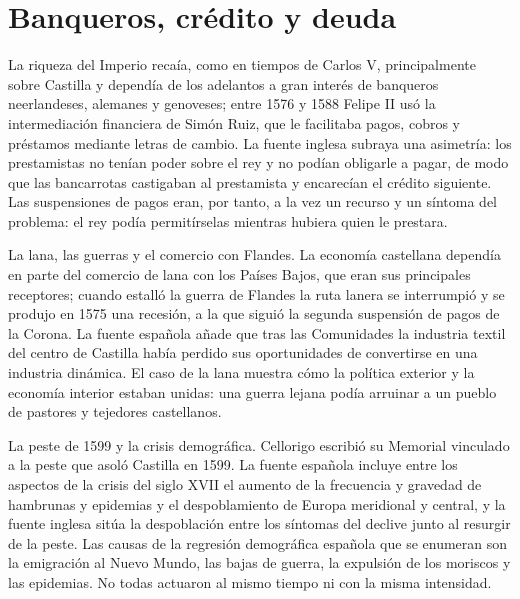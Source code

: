 \documentclass{book}
\begin{document}
\section{Banqueros, crédito y deuda}

La riqueza del Imperio recaía, como en tiempos de Carlos V, principalmente sobre Castilla y dependía de los adelantos a gran interés de banqueros neerlandeses, alemanes y genoveses; entre 1576 y 1588 Felipe II usó la intermediación financiera de Simón Ruiz, que le facilitaba pagos, cobros y préstamos mediante letras de cambio. La fuente inglesa subraya una asimetría: los prestamistas no tenían poder sobre el rey y no podían obligarle a pagar, de modo que las bancarrotas castigaban al prestamista y encarecían el crédito siguiente. Las suspensiones de pagos eran, por tanto, a la vez un recurso y un síntoma del problema: el rey podía permitírselas mientras hubiera quien le prestara.


La lana, las guerras y el comercio con Flandes. La economía castellana dependía en parte del comercio de lana con los Países Bajos, que eran sus principales receptores; cuando estalló la guerra de Flandes la ruta lanera se interrumpió y se produjo en 1575 una recesión, a la que siguió la segunda suspensión de pagos de la Corona. La fuente española añade que tras las Comunidades la industria textil del centro de Castilla había perdido sus oportunidades de convertirse en una industria dinámica. El caso de la lana muestra cómo la política exterior y la economía interior estaban unidas: una guerra lejana podía arruinar a un pueblo de pastores y tejedores castellanos.


La peste de 1599 y la crisis demográfica. Cellorigo escribió su Memorial vinculado a la peste que asoló Castilla en 1599. La fuente española incluye entre los aspectos de la crisis del siglo XVII el aumento de la frecuencia y gravedad de hambrunas y epidemias y el despoblamiento de Europa meridional y central, y la fuente inglesa sitúa la despoblación entre los síntomas del declive junto al resurgir de la peste. Las causas de la regresión demográfica española que se enumeran son la emigración al Nuevo Mundo, las bajas de guerra, la expulsión de los moriscos y las epidemias. No todas actuaron al mismo tiempo ni con la misma intensidad.
\end{document}
